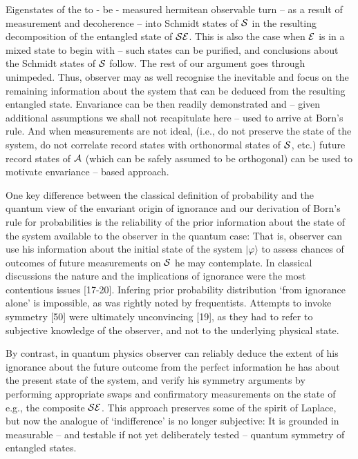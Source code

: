 \documentclass[aps,twocolumn,pra,epsfig]{revtex4}
\begin{document}
Eigenstates of the to - be - measured hermitean observable turn -- as a result
of measurement and decoherence -- into Schmidt states of ${\cal S}$ 
in the resulting decomposition of the entangled state of ${\cal SE}$. 
This is also the case when ${\cal E}$ is in a mixed state to begin with 
-- such states can be purified, and conclusions about the Schmidt states 
of ${\cal S}$ follow. The rest of our argument goes through unimpeded. 
Thus, observer may as well recognise the inevitable and focus on 
the remaining information about the system that can be deduced from 
the resulting entangled state. Envariance can be then readily demonstrated
and -- given additional assumptions we shall not recapitulate here -- used to
arrive at Born's rule. And when measurements are not ideal, (i.e., do not
preserve the state of the system, do not correlate record states with
orthonormal states of ${\cal S}$, etc.) future record states of ${\cal A}$
(which can be safely assumed to be orthogonal) can be used to motivate
envariance -- based approach.

One key difference between the classical definition of probability 
and the quantum view of the envariant origin of ignorance and our
derivation of Born's rule for probabilities is the reliability of the
prior information about the state of the system available to the observer
in the quantum case: That is, observer can use his information about
the initial state of the system $|\varphi\rangle$ to assess chances
of outcomes of future measurements on ${\cal S}$ he may contemplate.
In classical discussions the nature and the implications of ignorance were
the most contentious issues [17-20]. Infering prior probability
distribution `from ignorance alone' is impossible, as was rightly noted by
frequentists. Attempts to invoke symmetry [50] were ultimately unconvincing
[19], as they had to refer to subjective knowledge of the observer, and not
to the underlying physical state.

By contrast, in quantum physics observer can reliably deduce the extent of his
ignorance about the future outcome from the perfect information he has about
the present state of the system, and verify his symmetry arguments by
performing appropriate swaps and confirmatory measurements on the state
of e.g., the composite ${\cal SE}$. This approach preserves some of the spirit
of Laplace, but now the analogue of `indifference' is no longer subjective:
It is grounded in measurable -- and testable if not yet deliberately tested
-- quantum symmetry of entangled states.
\end{document}
